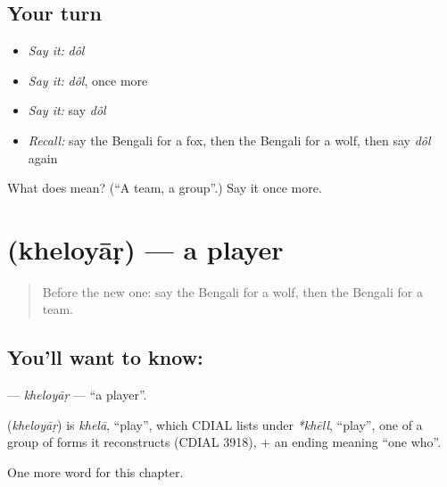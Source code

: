 \subsection*{Your turn}
\begin{itemize}
\raggedright
  \item \emph{Say it:} \emph{dôl}
  \item \emph{Say it:} \emph{dôl}, once more
  \item \emph{Say it:} say \emph{dôl}
  \item \emph{Recall:} say the Bengali for a fox, then the Bengali for a wolf, then say \emph{dôl} again
\end{itemize}

\begin{tcolorbox}[breakable,colback=teal!4,colframe=teal!35!black,title={Before you move on}]
What does  mean? (\textquotedblleft{}A team, a group\textquotedblright{}.) Say it once more.
\end{tcolorbox}
\section[\texorpdfstring{\bn{খেলোয়াড়} (kheloyāṛ)}{খেলোয়াড় (kheloyāṛ)}]{ (kheloyāṛ) — a player}

\label{lesson:BN-C225-kheloyar}



\begin{quote}
Before the new one: say the Bengali for a wolf, then the Bengali for a team.
\end{quote}

\subsection*{You'll want to know: }
\textbf{} — \emph{kheloyāṛ} — \textquotedblleft{}a player\textquotedblright{}.

\begin{cousinweb}
\textbf{} (\emph{kheloyāṛ}) is \emph{khelā}, \textquotedblleft{}play\textquotedblright{}, which CDIAL lists under \emph{*khēll}, \textquotedblleft{}play\textquotedblright{}, one of a group of forms it reconstructs (CDIAL 3918), + an ending meaning \textquotedblleft{}one who\textquotedblright{}.
\end{cousinweb}

\begin{grammarlens}[title={What you've built}]
One more word for this chapter.
\end{grammarlens}

